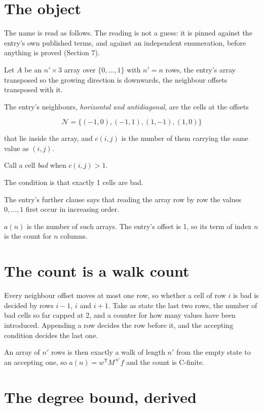 \documentclass[11pt]{article}
\theoremstyle{definition}
\begin{document}
\section{The object}

The name is read as follows. The reading is not a guess: it is pinned against the entry's own published terms, and against an independent enumeration, before anything is proved (Section 7).

Let $A$ be an $n' \times 3$ array over $\{0,\dots,1\}$ with $n' = n$ rows, the entry's array transposed so the growing direction is downwards, the neighbour offsets transposed with it.

The entry's neighbours, {\itshape horizontal and antidiagonal}, are the cells at the offsets

\[\mathcal{N} = \{(-1,0), (-1,1), (1,-1), (1,0)\}\]

that lie inside the array, and $c(i,j)$ is the number of them carrying the same value as $(i,j)$.

Call a cell {\itshape bad} when $c(i,j) > 1$.

The condition is that exactly 1 cells are bad.

The entry's further clause says that reading the array row by row the values $0,\dots,1$ first occur in increasing order.

$a(n)$ is the number of such arrays. The entry's offset is 1, so its term of index $n$ is the count for $n$ columns.

\section{The count is a walk count}

Every neighbour offset moves at most one row, so whether a cell of row $i$ is bad is decided by rows $i-1$, $i$ and $i+1$. Take as state the last two rows, the number of bad cells so far capped at 2, and a counter for how many values have been introduced. Appending a row decides the row before it, and the accepting condition decides the last one.

An array of $n'$ rows is then exactly a walk of length $n'$ from the empty state to an accepting one, so $a(n) = w^{\mathsf T}M^{\,n'}f$ and the count is C-finite.

\section{The degree bound, derived}
\end{document}
